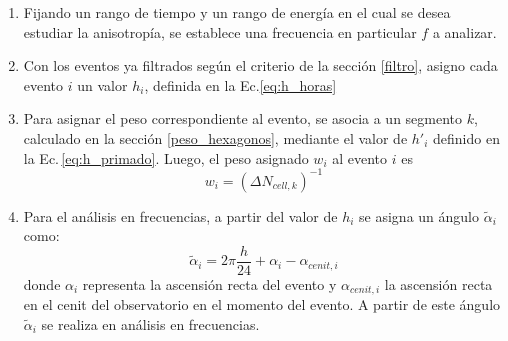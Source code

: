         \begin{enumerate}
        \item Fijando un rango de tiempo y un rango de energía en el cual se desea estudiar la anisotropía, se establece una frecuencia en particular $f$ a analizar.

        \item Con los eventos ya filtrados según el criterio de la sección \ref{filtro}, asigno cada evento $i$ un valor $h_i$, definida en la Ec.\ref{eq:h_horas}

        \item Para asignar el peso correspondiente al evento, se asocia a un segmento $k$, calculado en la sección \ref{peso_hexagonos}, mediante el valor de $h'_i$ definido en la Ec.\,\ref{eq:h_primado}. Luego, el peso asignado $w_i$  al evento $i$ es
        \begin{equation*}
           w_{i}= (\Delta N_{cell,k})^{-1}
        \end{equation*} 
         
        \item Para el análisis en frecuencias, a partir del valor de $h_i$ se asigna un ángulo $\tilde{\alpha}_i$ como:
        \begin{equation}
         \tilde{\alpha}_i = 2\pi \frac{h}{24} + \alpha_i -\alpha_{cenit,i}
        \end{equation}
        donde $\alpha_i$  representa la ascensión recta del evento y $\alpha_{cenit,i}$ la ascensión recta en el cenit del observatorio en el momento del evento. A partir de este ángulo $\tilde{\alpha}_i$ se realiza en análisis en frecuencias.


\end{enumerate}
